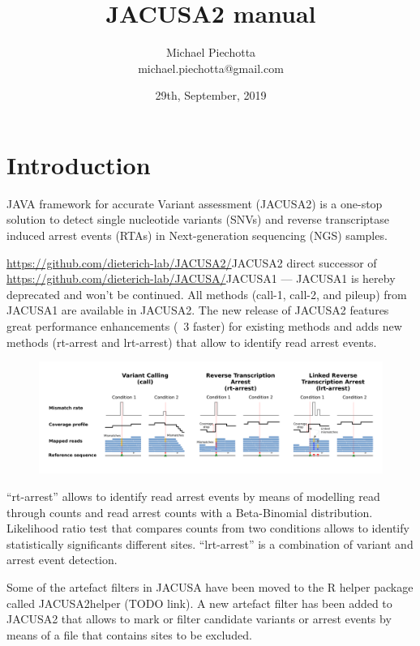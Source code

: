 \documentclass[10pt,a4paper]{article}
\title{JACUSA2 manual}
\author{Michael Piechotta \\ michael.piechotta@gmail.com}
\date{29th, September, 2019}
\begin{document}
\maketitle 
\tableofcontents
\listoftodos
\section{Introduction}
JAVA framework for accurate Variant assessment (JACUSA2) is a one-stop solution to detect single
nucleotide variants (SNVs) and reverse transcriptase induced arrest events (RTAs) in Next-generation 
sequencing (NGS) samples.

\url{https://github.com/dieterich-lab/JACUSA2/}{JACUSA2} direct successor of 
\url{https://github.com/dieterich-lab/JACUSA/}{JACUSA1} --- JACUSA1 is hereby deprecated and won't be 
continued. All methods (call-1, call-2, and pileup) from JACUSA1 are available in JACUSA2. 
The new release of JACUSA2 features great performance enhancements (~3 faster) for existing methods and adds 
new methods (rt-arrest and lrt-arrest) that allow to identify read arrest events. 

\begin{figure}[t]
	\centering
	\includegraphics[width=\textwidth]{figures/poster_jacusa_methods.pdf}
\end{figure}

``rt-arrest'' allows to identify read arrest events by means of modelling read through counts and 
read arrest counts with a Beta-Binomial distribution. Likelihood ratio test that compares counts from two conditions
allows to identify statistically significants different sites. ``lrt-arrest'' is a combination of variant and arrest event detection.

Some of the artefact filters in JACUSA have been moved to the R helper package called JACUSA2helper (TODO link).
A new artefact filter has been added to JACUSA2 that allows to mark or filter candidate variants or arrest events 
by means of a file that contains sites to be excluded.
\end{document}
